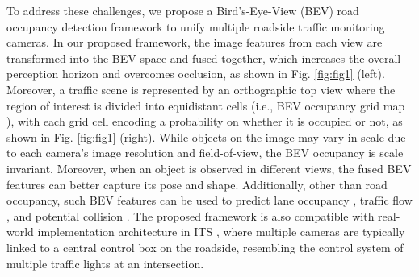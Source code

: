 To address these challenges, we propose a Bird's-Eye-View (BEV) road occupancy detection framework to unify multiple roadside traffic monitoring cameras. In our proposed framework, the image features from each view are transformed into the BEV space and fused together, which increases the overall perception horizon and overcomes occlusion, as shown in Fig. \ref{fig:fig1} (left). Moreover, a traffic scene is represented by an orthographic top view where the region of interest is divided into equidistant cells (i.e., BEV occupancy grid map \cite{bieder2021improving}\cite{schreiber2021dynamic}), with each grid cell encoding a probability on whether it is occupied or not, as shown in Fig. \ref{fig:fig1} (right). While objects on the image may vary in scale due to each camera's image resolution and field-of-view, the BEV occupancy is scale invariant. Moreover, when an object is observed in different views, the fused BEV features can better capture its pose and shape. Additionally, other than road occupancy, such BEV features can be used to predict lane occupancy \cite{kaniarasu2020goal}, traffic flow \cite{kashinath2021review}, and potential collision \cite{yu2018space}. The proposed framework is also compatible with real-world implementation architecture in ITS \cite{arnold2020cooperative}, where multiple cameras are typically linked to a central control box on the roadside, resembling the control system of multiple traffic lights at an intersection.




